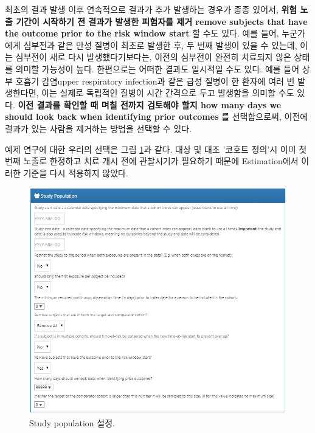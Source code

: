 \documentclass[10.5pt]{book}
\theoremstyle{definition}
\theoremstyle{definition}
\theoremstyle{definition}
\theoremstyle{remark}
\begin{document}
최초의 결과 발생 이후 연속적으로 결과가 추가 발생하는 경우가 종종
있어서, \textbf{위험 노출 기간이 시작하기 전 결과가 발생한 피험자를 제거
remove subjects that have the outcome prior to the risk window start} 할
수도 있다. 예를 들어, 누군가에게 심부전과 같은 만성 질병이 최초로 발생한
후, 두 번째 발생이 있을 수 있는데, 이는 심부전이 새로 다시
발생했다기보다는, 이전의 심부전이 완전히 치료되지 않은 상태를 의미할
가능성이 높다. 한편으로는 어떠한 결과도 일시적일 수도 있다. 예를 들어
상부 호흡기 감염upper respiratory infection과 같은 급성 질병이 한 환자에
여러 번 발생한다면, 이는 실제로 독립적인 질병이 시간 간격으로 두고
발생함을 의미할 수도 있다. \textbf{이전 결과를 확인할 때 며칠 전까지
검토해야 할지 how many days we should look back when identifying prior
outcomes} 를 선택함으로써, 이전에 결과가 있는 사람을 제거하는 방법을
선택할 수 있다.

예제 연구에 대한 우리의 선택은 그림 \ref{fig:studyPopulation}과 같다.
대상 및 대조 '코호트 정의'시 이미 첫 번째 노출로 한정하고 치료 개시 전에
관찰시기가 필요하기 때문에 Estimation에서 이러한 기준을 다시 적용하지
않았다.

\begin{figure}

{\centering \includegraphics[width=1\linewidth]{images/PopulationLevelEstimation/studyPopulation} 

}

\caption{Study population 설정.}\label{fig:studyPopulation}
\end{figure}
\end{document}
